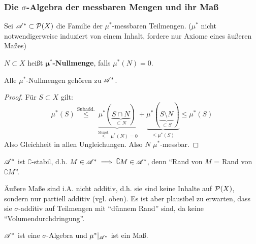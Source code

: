 \subsubsection{Die $\sigma$-Algebra der messbaren Mengen und ihr Maß}
Sei $\AA^*\subset \PP(X)$ die Familie der $\mu^*$-messbaren Teilmengen. ($\mu^*$ nicht notwendigerweise induziert von einem Inhalt, fordere nur Axiome eines äußeren Maßes)

\begin{definition}
$N \subset X$ heißt \textbf{$\boldsymbol\mu^{\boldsymbol*}$-Nullmenge}, falls $\mu^*(N)=0$.
\end{definition}

\begin{lemma}
Alle $\mu^*$-Nullmengen gehören zu $\AA^*$.
\begin{proof}
Für $S\subset X$ gilt:
$$
\mu^*(S) \overset{\text{Subadd.}}\leq \underbrace{\mu^*(\underbrace{S\cap N}_{\subset N})}_{\overset{\text{Monot.}}\leq \mu^*(N)=0}+\underbrace{\mu^*({\underbrace{S\setminus N}_{\subset S}})}_{\leq \mu^*(S)} \leq \mu^*(S)
$$
Also Gleichheit in allen Ungleichungen. Also $N$ $\mu^*$-messbar.
\end{proof}
\end{lemma}

\begin{beobachtung}
$\AA^*$ ist $\complement$-stabil, d.h. $M \in \AA^* \implies \complement M \in \AA^*$, denn ``Rand von $M$ = Rand von $\complement M$''.
\end{beobachtung}

Äußere Maße sind i.A. nicht additiv, d.h. sie sind keine Inhalte auf $\PP(X)$, sondern nur partiell additiv (vgl. oben). Es ist aber plausibel zu erwarten, dass sie $\sigma$-additiv auf Teilmengen mit ``dünnem Rand'' sind, da keine ``Volumendurchdringung''.

\begin{satz}
\begin{mdframed}
$\AA^*$ ist eine $\sigma$-Algebra und $\mu^*|_{\AA^*}$ ist ein Maß.
\end{mdframed}
\end{satz}

